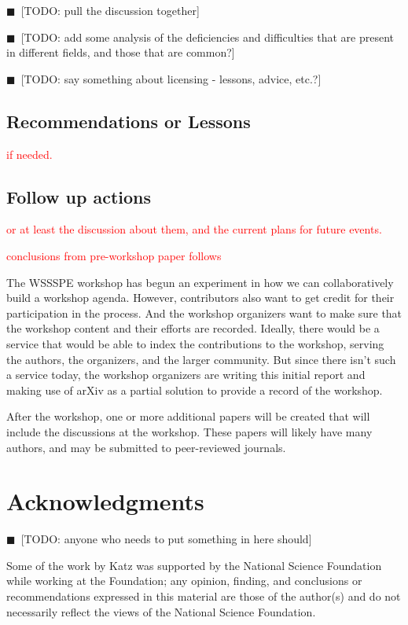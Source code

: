 \documentclass[11pt, oneside]{amsart}
\newcommand{\todo}[1]{{\color{blue}$\blacksquare$~\textsf{[TODO: #1]}}}
\newcommand{\note}[1]{ {\textcolor{red}    { #1 }}}
\begin{document}
\todo{pull the discussion together}

\todo{add some analysis of the deficiencies and difficulties that are
  present in different fields, and those that are common?}

\todo{say something about licensing - lessons, advice, etc.?}

\subsection{Recommendations or Lessons}

\note{if needed.}

\subsection{Follow up actions}

\note{or at least the discussion about them, and the current plans for
  future events.}

\note{conclusions from pre-workshop paper follows}

The WSSSPE workshop has begun an experiment in how we can
collaboratively build a workshop agenda. However, contributors also
want to get credit for their participation in the process. And the
workshop organizers want to make sure that the workshop content and
their efforts are recorded.  Ideally, there would be a service that
would be able to index the contributions to the workshop, serving the
authors, the organizers, and the larger community. But since there
isn't such a service today, the workshop organizers are writing this
initial report and making use of arXiv as a partial solution to
provide a record of the workshop.

After the workshop, one or more additional papers will be created that
will include the discussions at the workshop. These papers will likely
have many authors, and may be submitted to peer-reviewed journals.


\section*{Acknowledgments}

\todo{anyone who needs to put something in here should}

Some of the work by Katz was
supported by the National Science Foundation while working at the
Foundation; any opinion, finding, and conclusions or recommendations
expressed in this material are those of the author(s) and do not
necessarily reflect the views of the National Science Foundation.
\end{document}
